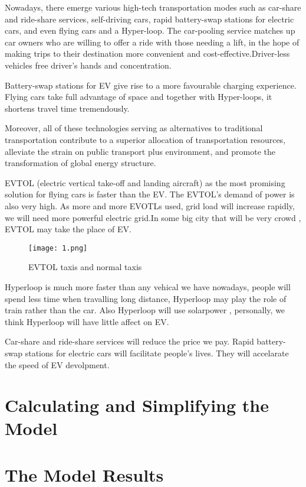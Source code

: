 \documentclass{mcmthesis}
\begin{document}
Nowadays, there emerge various high-tech transportation modes such as car-share and ride-share services, self-driving cars, rapid battery-swap stations for electric cars, and even flying cars and a Hyper-loop. The car-pooling service matches up car owners who are willing to offer a ride with those needing a lift, in the hope of making trips to their destination more convenient and cost-effective.Driver-less vehicles free driver’s hands and concentration.

Battery-swap stations for EV give rise to a more favourable charging experience. Flying cars take full advantage of space and together with Hyper-loops, it shortens travel time tremendously. 

Moreover, all of these technologies serving as alternatives to traditional transportation contribute to a superior allocation of transportation resources, alleviate the strain on public transport plus environment, and promote the transformation of global energy structure.

EVTOL (electric vertical take-off and landing aircraft) as the most promising solution for flying cars is faster than the EV. The EVTOL's demand of power is also very high. As more and more EVOTLs used, grid load will increase rapidly, we will need more powerful electric grid.In some big city that will be very crowd , EVTOL may take the place of EV.

\begin{figure}[htbp]
\small
\centering
\texttt{[image: 1.png]}
\caption{EVTOL taxis and normal taxis} 
\end{figure}

Hyperloop is much more faster than any vehical we have nowadays, people will spend less time when travalling long distance, Hyperloop may play the role of train rather than the car. Also Hyperloop will use solarpower , personally, we think Hyperloop will have little affect on EV.

Car-share and ride-share services will reduce the price we pay. Rapid battery-swap stations for electric cars will facilitate people's lives. They will accelarate the speed of EV devolpment.

\section{Calculating and Simplifying the Model  }

\section{The Model Results}
\end{document}
